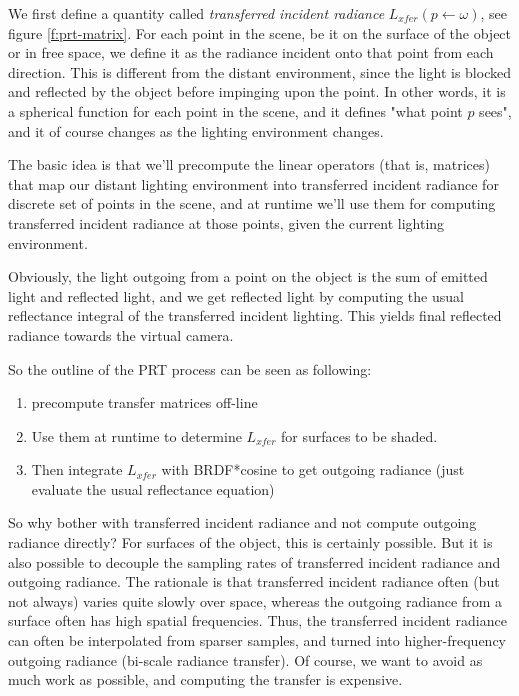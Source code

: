 We first define a quantity called \textit{transferred incident radiance} $L_{xfer}(p\leftarrow\omega)$, see figure \ref{f:prt-matrix}. For each point in the scene, be it on the surface of the object or in free space, we define it as the radiance incident onto that point from each direction. This is different from the distant environment, since the light is blocked and reflected by the object before impinging upon the point. In other words, it is a spherical function for each point in the scene, and it defines "what point $p$ sees", and it of course changes as the lighting environment changes.


The basic idea is that we'll precompute the linear operators (that is, matrices) that map our distant lighting environment into transferred incident radiance for discrete set of points in the scene, and at runtime we'll use them for computing transferred incident radiance at those points, given the current lighting environment.

Obviously, the light outgoing from a point on the object is the sum of emitted light and reflected light, and we get reflected light by computing the usual reflectance integral of the transferred incident lighting. This yields final reflected radiance towards the virtual camera.

So the outline of the PRT process can be seen as following:

\begin{enumerate}
	\item precompute transfer matrices off-line
	\item Use them at runtime to determine $L_{xfer}$ for surfaces to be shaded.
	\item Then integrate $L_{xfer}$ with BRDF*cosine to get outgoing radiance (just evaluate the usual reflectance equation)
\end{enumerate}

\begin{fullwidth}
\begin{tcolorbox}
So why bother with transferred incident radiance and not compute outgoing radiance directly? For surfaces of the object, this is certainly possible. But it is also possible to decouple the sampling rates of transferred incident radiance and outgoing radiance. The rationale is that transferred incident radiance often (but not always) varies quite slowly over space, whereas the outgoing radiance from a surface often has high spatial frequencies. Thus, the transferred incident radiance can often be interpolated from sparser samples, and turned into higher-frequency outgoing radiance (bi-scale radiance transfer). Of course, we want to avoid as much work as possible, and computing the transfer is expensive.
\end{tcolorbox}
\end{fullwidth}



